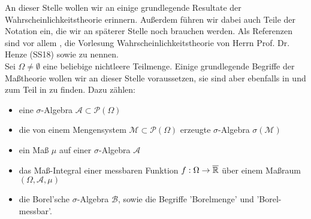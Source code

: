 An dieser Stelle wollen wir an einige grundlegende Resultate der Wahrscheinlichkeitstheorie erinnern. Außerdem führen wir dabei auch Teile der Notation ein, die wir an späterer Stelle noch brauchen werden. Als Referenzen sind vor allem \cite{brokate2016grundwissen}, die Vorlesung Wahrscheinlichkeitstheorie von Herrn Prof. Dr. Henze (SS18) sowie \cite{klenke2006wahrscheinlichkeitstheorie}
zu nennen.\\ Sei $ \Omega \not = \emptyset $ eine beliebige nichtleere Teilmenge.
Einige grundlegende Begriffe der Maßtheorie wollen wir an dieser Stelle voraussetzen, sie sind aber ebenfalls in \cite{klenke2006wahrscheinlichkeitstheorie} und zum Teil in \cite{lapeyre2003introduction} zu finden. Dazu zählen:
\begin{itemize}
	\item eine $ \sigma $-Algebra $ \mathcal{A} \subset \mathcal{P}(\Omega) $
	\item die von einem Mengensystem $ \mathcal{M} \subset \mathcal{P}(\Omega)  $ erzeugte $ \sigma $-Algebra $ \sigma(\mathcal{M}) $
	\item ein Maß $ \mu $ auf einer $ \sigma $-Algebra $ \mathcal{A} $
	\item das Maß-Integral einer messbaren Funktion $ f:\Omega \to \overline{\mathbb{R}} $ über einem Maßraum $ (\Omega, \mathcal{A},\mu) $
	\item die Borel'sche $ \sigma $-Algebra $ \mathcal{B} $, sowie die Begriffe 'Borelmenge' und 'Borel-messbar'.
\end{itemize}

